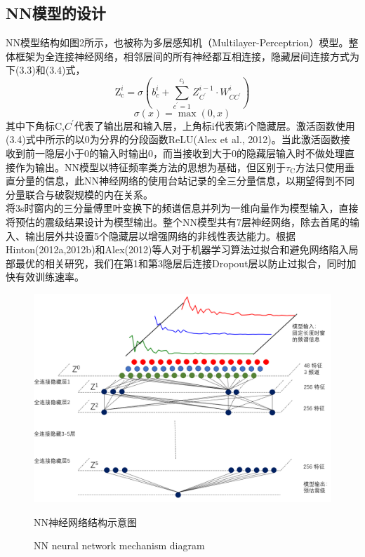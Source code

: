 \subsection{NN模型的设计}
\indent NN模型结构如图2所示，也被称为多层感知机（Multilayer-Perceptrion）模型。整体框架为全连接神经网络，相邻层间的所有神经都互相连接，隐藏层间连接方式为下(3.3)和(3.4)式，
\begin{equation}
\mathrm{Z}_{\mathrm{c}}^{i}=\sigma\left(b_{c}^{i}+\sum_{c^{\prime}=1}^{c_{i}} Z_{C^{\prime}}^{i-1} \cdot W_{C C^{\prime}}^{i}\right)
\end{equation}
\begin{equation}
\sigma(x)=\max (0, x)
\end{equation}
其中下角标C,$C^{\prime}$代表了输出层和输入层，上角标i代表第i个隐藏层。激活函数使用(3.4)式中所示的以0为分界的分段函数ReLU(Alex et al., 2012)。当此激活函数接收到前一隐层小于0的输入时输出0，而当接收到大于0的隐藏层输入时不做处理直接作为输出。NN模型以特征频率类方法的思想为基础，但区别于$\tau_{\mathrm{C}}$方法只使用垂直分量的信息，此NN神经网络的使用台站记录的全三分量信息，以期望得到不同分量联合与破裂规模的内在关系。\\
\indent 将3s时窗内的三分量傅里叶变换下的频谱信息并列为一维向量作为模型输入，直接将预估的震级结果设计为模型输出。整个NN模型共有7层神经网络，除去首尾的输入、输出层外共设置5个隐藏层以增强网络的非线性表达能力。根据Hinton(2012a,2012b)和Alex(2012)等人对于机器学习算法过拟合和避免网络陷入局部最优的相关研究，我们在第1和第3隐层后连接Dropout层以防止过拟合，同时加快有效训练速率。\\
\begin{figure}[!h] 
\centering 
 \includegraphics[width=0.99\linewidth]{img/NN.png} 
 \renewcommand{\figurename}{图} 
\caption{NN神经网络结构示意图} 
\addtocounter{figure}{-1} \vspace{-5pt} 
\renewcommand{\figurename}{Fig} 
\caption{NN neural network mechanism diagram} 
\renewcommand{\figurename}{图} 
\label{fig:network-device-influence.png} 
\end{figure}
